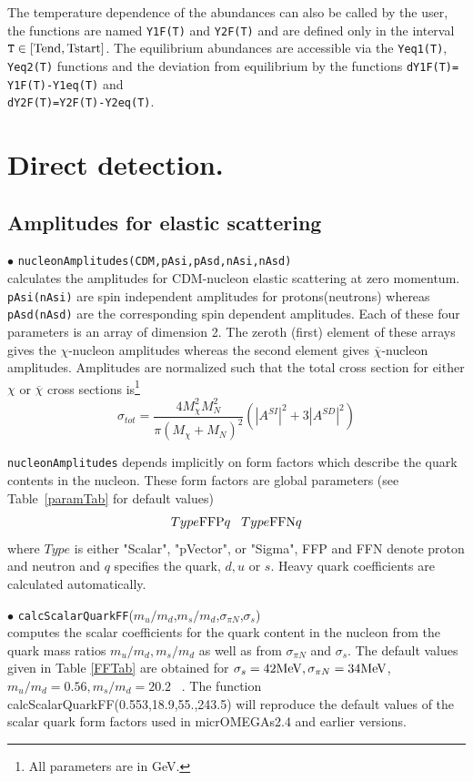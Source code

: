 \documentclass[12pt,a4paper]{article}
\begin{document}
The  temperature dependence  of the abundances can also be called by the user, the functions are named {\tt Y1F(T)} and {\tt Y2F(T)} and are defined only in the  interval ${\tt T}\in
[\rm{Tend},\rm{Tstart}]$. The equilibrium abundances are accessible via  the  { \tt Yeq1(T)}, { \tt Yeq2(T)} functions and the deviation from equilibrium  
by the functions
 {\tt dY1F(T)= Y1F(T)-Y1eq(T)}  and \\
   { \tt dY2F(T)=Y2F(T)-Y2eq(T)}.
 
 

\section{Direct detection.}
\subsection{Amplitudes for elastic scattering}
\noindent
 $\bullet$ \verb|nucleonAmplitudes(CDM,pAsi,pAsd,nAsi,nAsd)|\\
calculates the amplitudes for CDM-nucleon elastic
scattering at zero momentum. \verb|pAsi(nAsi)| are spin
independent amplitudes for protons(neutrons) whereas
\verb|pAsd(nAsd)| are the corresponding spin dependent amplitudes.
Each of these four parameters is an array of 
dimension 2. The zeroth (first) element of these arrays gives the
$\chi$-nucleon amplitudes whereas the second element gives
$\overline{\chi}$-nucleon amplitudes. Amplitudes are normalized
such that the total cross section for either $\chi$ or $\overline
\chi$ cross sections is\footnote{All parameters are in GeV.}
\begin{equation}
\sigma_{tot}=\frac{4M_{\chi}^2 M_N^2}{\pi(M_{\chi}+M_N)^2}(|A^{SI}|^2+3|A^{SD}|^2)
\label{eq:norm}
\end{equation}

\verb|nucleonAmplitudes| depends implicitly on form factors which describe the 
quark contents in the nucleon. These form factors are global parameters (see
Table~\ref{paramTab} for
default values)
\begin{equation}
Type{\rm FFP}q \;\;\; Type{\rm FFN}q \nonumber
\end{equation} 
where $Type$ is either "Scalar", "pVector", or "Sigma",  FFP and FFN denote proton and neutron  and
$q$ specifies the quark, $d,u$  or $s$. Heavy quark coefficients are calculated automatically.



\noindent$\bullet$
{\tt calcScalarQuarkFF}($m_u/m_d$,$m_s/m_d$,$\sigma_{\pi N}$,$\sigma_s$)\\
computes the scalar coefficients for the quark content in the nucleon from the quark mass ratios
$m_u/m_d, m_s/m_d$ as well as from $\sigma_{\pi N}$ and $\sigma_s$.
The default values given in Table  \ref{FFTab} are obtained for 
$\sigma_s=42{\rm MeV},\sigma_{\pi N}=34{\rm MeV}$, $m_u/m_d=0.56, m_s/m_d=20.2$ ~\cite{Beringer:1900zz}.
The function calcScalarQuarkFF(0.553,18.9,55.,243.5)  will reproduce   the default values of the  scalar quark
form factors used in micrOMEGAs2.4 and earlier  versions.
\end{document}
